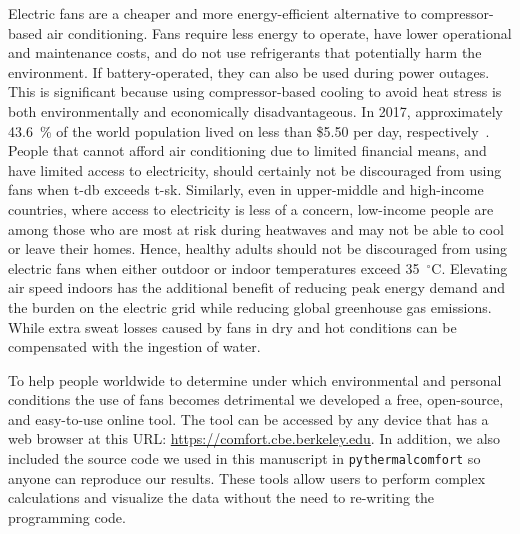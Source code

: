 Electric fans are a cheaper and more energy-efficient alternative to compressor-based air conditioning.
Fans require less energy to operate, have lower operational and maintenance costs, and do not use refrigerants that potentially harm the environment. 
If battery-operated, they can also be used during power outages.
This is significant because using compressor-based cooling to avoid heat stress is both environmentally and economically disadvantageous.
In 2017, approximately 43.6~\% of the world population lived on less than \$5.50 per day, respectively~\cite{PovertyO1:online}.
People that cannot afford air conditioning due to limited financial means, and have limited access to electricity, should certainly not be discouraged from using fans when \ac{t-db} exceeds \ac{t-sk}.
Similarly, even in upper-middle and high-income countries, where access to electricity is less of a concern, low-income people are among those who are most at risk during heatwaves and may not be able to cool or leave their homes.
Hence, healthy adults should not be discouraged from using electric fans when either outdoor or indoor temperatures exceed 35~$^{\circ}$C.\@
Elevating air speed indoors has the additional benefit of reducing peak energy demand and the burden on the electric grid while reducing global greenhouse gas emissions.
While extra sweat losses caused by fans in dry and hot conditions can be compensated with the ingestion of water.

To help people worldwide to determine under which environmental and personal conditions the use of fans becomes detrimental we developed a free, open-source, and easy-to-use online tool.
The tool can be accessed by any device that has a web browser at this URL: \url{https://comfort.cbe.berkeley.edu}.
In addition, we also included the source code we used in this manuscript in \verb|pythermalcomfort| so anyone can reproduce our results.
These tools allow users to perform complex calculations and visualize the data without the need to re-writing the programming code.


